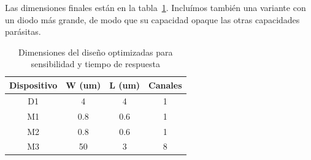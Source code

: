 Las dimensiones finales están en la tabla~\ref{fig:areas_aps}.
Incluímos también una variante con un diodo más grande,
de modo que su capacidad opaque las otras capacidades parásitas.
\begin{table}[h]
    \centering
    \caption{Dimensiones del diseño optimizadas para sensibilidad y tiempo de
    respuesta}
    \begin{tabular}{|c|c|c|c|}
        \hline
        Dispositivo&      W (um)&    L (um)&  Canales\\
        \hline
D1&     4&  4&  1\\
M1&     0.8&    0.6&    1\\
M2&     0.8&    0.6&    1\\
M3&     50& 3&  8\\
        \hline
    \end{tabular}
    \label{fig:areas_aps}
\end{table}

